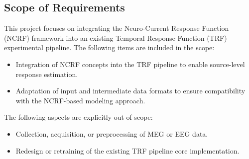 \documentclass[12pt]{article}
\begin{document}

\subsection{Scope of Requirements}
This project focuses on integrating the Neuro-Current Response Function (NCRF) framework into an existing Temporal Response Function (TRF) experimental pipeline.
The following items are included in the scope:
\begin{itemize}
  \item Integration of NCRF concepts into the TRF pipeline to enable source-level response estimation.
  \item Adaptation of input and intermediate data formats to ensure compatibility with the NCRF-based modeling approach.
\end{itemize}
The following aspects are explicitly out of scope:
\begin{itemize}
  \item Collection, acquisition, or preprocessing of MEG or EEG data.
  \item Redesign or retraining of the existing TRF pipeline core implementation.
\end{itemize}


\end{document}
